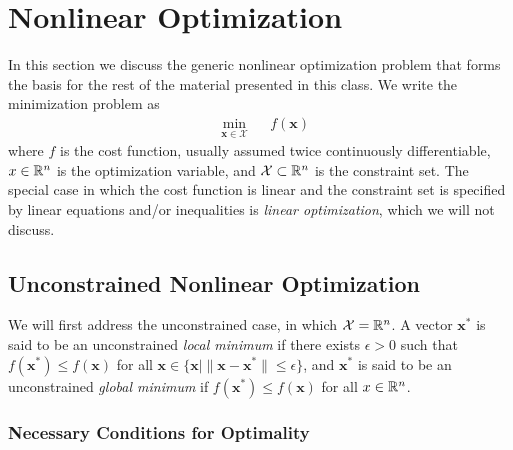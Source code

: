\chapter{Nonlinear Optimization}

In this section we discuss the generic nonlinear optimization problem that forms the basis for the rest of the material presented in this class. We write the minimization problem as 
\begin{equation*}
\begin{aligned}
& \underset{\bm{x} \in \mathcal{X}}{\min}
& & f(\bm{x})
\end{aligned}
\end{equation*}
where $f$ is the cost function, usually assumed twice continuously differentiable, $x \in \mathbb{R}^n$ is the optimization variable, and $\mathcal{X} \subset \mathbb{R}^n$ is the constraint set. The special case in which the cost function is linear and the constraint set is specified by linear equations and/or inequalities is \textit{linear optimization}, which we will not discuss. 

\section{Unconstrained Nonlinear Optimization}

We will first address the unconstrained case, in which $\mathcal{X} = \mathbb{R}^n$. A vector $\bm{x}^*$ is said to be an unconstrained \textit{local minimum} if there exists $\epsilon > 0$ such that $f(\bm{x}^*) \leq f(\bm{x})$ for all $\bm{x} \in \{\bm{x} \mid \|\bm{x} - \bm{x}^*\| \leq \epsilon\}$, and $\bm{x}^*$ is said to be an unconstrained \textit{global minimum} if $f(\bm{x}^*) \leq f(\bm{x})$ for all $x \in \mathbb{R}^n$. 

\subsection{Necessary Conditions for Optimality}

